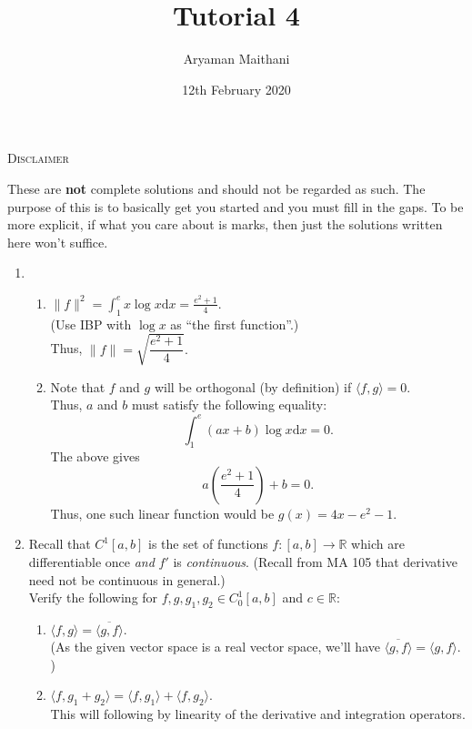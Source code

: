\documentclass{article}
\title{Tutorial 4}				%
\author{Aryaman Maithani}
\date{12th February 2020}		%
\begin{document}
\maketitle

\hrulefill

\begin{center}
	\textsc{Disclaimer}
\end{center}
These are \textbf{not} complete solutions and should not be regarded as such. The purpose of this is to basically get you started and you must fill in the gaps. To be more explicit, if what you care about is marks, then just the solutions written here won't suffice.

\hrulefill

\begin{enumerate} 
	\itemsep1em
	\item \begin{enumerate} 
		\item $\|f\|^2 = \displaystyle\int_{1}^{e} x\log x \text{d}x = \frac{e^2 + 1}{4}.$\\
		(Use IBP with $\log x$ as ``the first function''.)\\
		Thus, $\|f\| = \sqrt{\dfrac{e^2 + 1}{4}}.$
		\item Note that $f$ and $g$ will be orthogonal (by definition) if $\langle f, g\rangle = 0.$\\
		Thus, $a$ and $b$ must satisfy the following equality:
		\[\int_{1}^{e} (ax + b)\log x \text{d}x = 0.\]
		The above gives
		\[a\left(\frac{e^2 + 1}{4}\right) + b = 0.\]
		Thus, one such linear function would be $g(x) = 4x - e^2 - 1.$
	\end{enumerate}
	\item Recall that $C^1[a, b]$ is the set of functions $f:[a, b] \to \mathbb{R}$ which are differentiable once \emph{and} $f'$ is \emph{continuous}. (Recall from MA 105 that derivative need not be continuous in general.) \\
	Verify the following for $f, g, g_1, g_2 \in C_0^1[a, b]$ and $c \in \mathbb{R}$:
	\begin{enumerate}[nosep] 
		\item $\langle f, g\rangle = \overline{\langle g, f\rangle}.$\\
		(As the given vector space is a real vector space, we'll have $\overline{\langle g, f\rangle} = \langle g, f\rangle.$)
		\item $\langle f, g_1 + g_2\rangle = \langle f, g_1\rangle + \langle f, g_2\rangle.$\\
		This will following by linearity of the derivative and integration operators.

\end{enumerate}
\end{enumerate}
\end{document}
